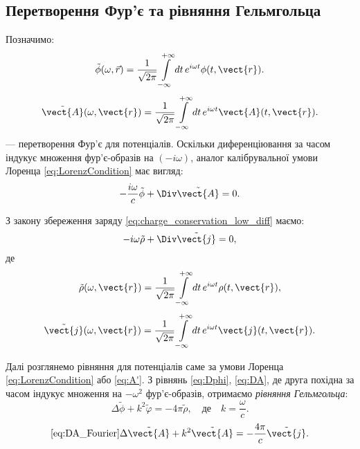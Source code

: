 \subsection*{Перетворення Фур’є та рівняння Гельмгольца}

Позначимо:
\begin{equation}\label{eq:tilde_phi}
	\tilde{\phi}(\omega, \vec{r}) = \frac{1}{\sqrt{2\pi}} \int\limits_{-\infty}^{+\infty} dt \, e^{i \omega t} \phi(t, \vect{r}).
\end{equation}
\begin{equation}\label{eq:tilde_A}
	\tilde{\vect{A}}(\omega, \vect{r}) = \frac{1}{\sqrt{2\pi}} \int\limits_{-\infty}^{+\infty} dt \, e^{i \omega t} \vect{A}(t, \vect{r}).
\end{equation}
--- перетворення Фур’є для потенціалів.
Оскільки диференціювання за часом індукує множення фур’є-образів на \((-i \omega)\), аналог калібрувальної умови Лоренца \eqref{eq:LorenzCondition} має
вигляд:
\begin{equation}
	-\frac{i \omega}{c} \tilde{\phi} + \Div \tilde{\vect{A}} = 0.
\end{equation}

З закону збереження заряду \eqref{eq:charge_conservation_low_diff} маємо:
\begin{equation}
	-i \omega \tilde{\rho} + \Div \tilde{\vect{j}} = 0,
\end{equation}
де
\begin{equation}
	\tilde{\rho}(\omega, \vect{r}) = \frac{1}{\sqrt{2\pi}} \int\limits_{-\infty}^{+\infty} dt \, e^{i \omega t} \rho(t, \vect{r}),
\end{equation}
\begin{equation}
	\tilde{\vect{j}}(\omega, \vect{r}) = \frac{1}{\sqrt{2\pi}} \int\limits_{-\infty}^{+\infty} dt \, e^{i \omega t} \vect{j}(t, \vect{r}).
\end{equation}

Далі розглянемо рівняння для потенціалів саме за умови Лоренца \eqref{eq:LorenzCondition} або \eqref{eq:A'}. З рівнянь \eqref{eq:Dphi}, \eqref{eq:DA},
де друга похідна за часом індукує множення на \( -\omega^2 \) фур’є-образів, отримаємо \emph{рівняння Гельмгольца}:
\begin{equation}\label{eq:Dphi_Fourier}
	\Delta \tilde{\phi} + k^2 \tilde{\varphi} = -4\pi \tilde{\rho}, \quad \text{де} \quad k = \frac{\omega}{c}.
\end{equation}
\begin{equation}\eqref{eq:DA_Fourier}
	\Delta \tilde{\vect{A}} + k^2 \tilde{\vect{A}} = -\frac{4\pi}{c} \tilde{\vect{j}}.
\end{equation}



